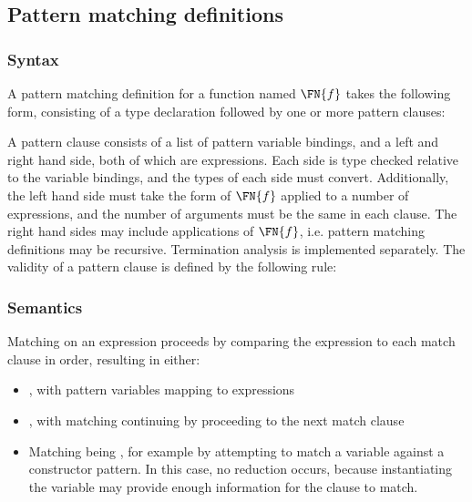 \subsection{Pattern matching definitions}

\label{sect:patdefs}

\subsubsection{Syntax}

A pattern matching definition for a function named $\FN{f}$ takes the following form,
consisting of a type declaration followed by one or more pattern clauses:


A pattern clause consists of a list of pattern variable bindings, 
and a left and right hand side, both of which
are \TT{} expressions. Each side is type checked relative to the variable bindings,
and the types of each side must convert. Additionally, the
left hand side must take the form of $\FN{f}$ applied to a number of \TT{} expressions,
and the number of arguments must be the same in each clause. The right hand
sides may include applications of $\FN{f}$, i.e. pattern matching definitions may
be recursive. Termination analysis is implemented separately. The validity of a pattern
clause is defined by the following rule:


\subsubsection{Semantics}

Matching on an expression proceeds by comparing the expression to
each match clause in order, resulting in either:

\begin{itemize}
\item {}, with pattern variables mapping to expressions
\item {}, with matching continuing by proceeding to the next match clause
\item Matching being , for example by attempting to match a variable
against a constructor pattern. In this case, no reduction occurs, because instantiating
the variable may provide enough information for the clause to match.
\end{itemize}

